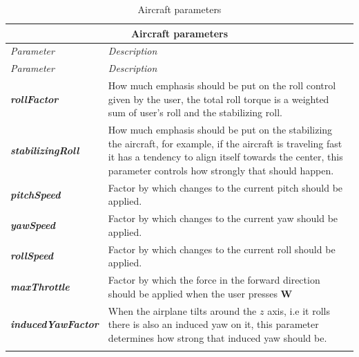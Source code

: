 \begin{center}
	\begin{longtable}{ | p{} | p{} | }
		
		\hline
		\multicolumn{2}{|c|}{\textbf{Aircraft parameters}}
		\\ \hline
		
		\emph{Parameter} & \emph{Description}
		\\ \hline \hline
		\endfirsthead %
		
		\hline
		\emph{Parameter} & \emph{Description}
		\\ \hline \hline
		\endhead %
	
		\hline
		\endfoot %
		
		\endlastfoot %
		
		\emph{\textbf{rollFactor}}
		& How much emphasis should be put on the roll control given by the user, the total roll torque is a weighted sum of user's roll and the stabilizing roll.
		\\ \hline
		
		\emph{\textbf{stabilizingRoll}}
		& How much emphasis should be put on the stabilizing the aircraft, for example, if the aircraft is traveling fast it has a tendency to align itself towards the center, this parameter controls how strongly that should happen.
		\\ \hline
		
		\emph{\textbf{pitchSpeed}}
		& Factor by which changes to the current pitch should be applied. 
		\\ \hline
		
		\emph{\textbf{yawSpeed}}
		& Factor by which changes to the current yaw should be applied. 
		\\ \hline
		
		\emph{\textbf{rollSpeed}}
		& Factor by which changes to the current roll should be applied. 
		\\ \hline
		
		\emph{\textbf{maxThrottle}}
		& Factor by which the force in the forward direction should be applied when the user presses \textbf{W}
		\\ \hline
		
		\emph{\textbf{inducedYawFactor}}
		& When the airplane tilts around the $z$ axis, i.e it rolls there is also an induced yaw on it, this parameter determines how strong that induced yaw should be. 
		\\ \hline
		
		\caption{Aircraft parameters}
		\label{tab:aircraft_params}		
	\end{longtable}
\end{center}



